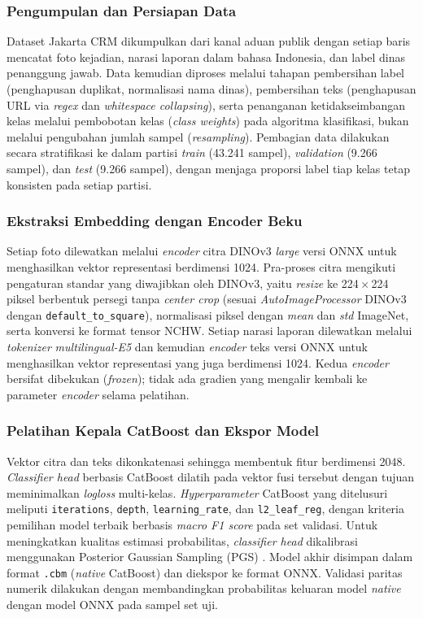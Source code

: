 \subsubsection{Pengumpulan dan Persiapan Data}

Dataset Jakarta CRM dikumpulkan dari kanal aduan publik dengan setiap baris mencatat foto kejadian, narasi laporan dalam bahasa Indonesia, dan label dinas penanggung jawab. Data kemudian diproses melalui tahapan pembersihan label (penghapusan duplikat, normalisasi nama dinas), pembersihan teks (penghapusan URL via \textit{regex} dan \textit{whitespace collapsing}), serta penanganan ketidakseimbangan kelas melalui pembobotan kelas (\textit{class weights}) pada algoritma klasifikasi, bukan melalui pengubahan jumlah sampel (\textit{resampling}). Pembagian data dilakukan secara stratifikasi ke dalam partisi \textit{train} (43.241 sampel), \textit{validation} (9.266 sampel), dan \textit{test} (9.266 sampel), dengan menjaga proporsi label tiap kelas tetap konsisten pada setiap partisi.

\subsubsection{Ekstraksi Embedding dengan Encoder Beku}

Setiap foto dilewatkan melalui \textit{encoder} citra DINOv3 \textit{large} versi ONNX untuk menghasilkan vektor representasi berdimensi 1024. Pra-proses citra mengikuti pengaturan standar yang diwajibkan oleh DINOv3, yaitu \textit{resize} ke 224\,$\times$\,224 piksel berbentuk persegi tanpa \textit{center crop} (sesuai \textit{AutoImageProcessor} DINOv3 dengan \texttt{default\_to\_square}), normalisasi piksel dengan \textit{mean} dan \textit{std} ImageNet, serta konversi ke format tensor NCHW. Setiap narasi laporan dilewatkan melalui \textit{tokenizer} \textit{multilingual-E5} dan kemudian \textit{encoder} teks versi ONNX untuk menghasilkan vektor representasi yang juga berdimensi 1024. Kedua \textit{encoder} bersifat dibekukan (\textit{frozen}); tidak ada gradien yang mengalir kembali ke parameter \textit{encoder} selama pelatihan.

\subsubsection{Pelatihan Kepala CatBoost dan Ekspor Model}

Vektor citra dan teks dikonkatenasi sehingga membentuk fitur berdimensi 2048. \textit{Classifier head} berbasis CatBoost dilatih pada vektor fusi tersebut dengan tujuan meminimalkan \textit{logloss} multi-kelas. \textit{Hyperparameter} CatBoost yang ditelusuri meliputi \texttt{iterations}, \texttt{depth}, \texttt{learning\_rate}, dan \texttt{l2\_leaf\_reg}, dengan kriteria pemilihan model terbaik berbasis \textit{macro F1 score} pada set validasi. Untuk meningkatkan kualitas estimasi probabilitas, \textit{classifier head} dikalibrasi menggunakan Posterior Gaussian Sampling (PGS) \citep{ustimenkoCatBoostUncertainty2023}. Model akhir disimpan dalam format \texttt{.cbm} (\textit{native} CatBoost) dan diekspor ke format ONNX. Validasi paritas numerik dilakukan dengan membandingkan probabilitas keluaran model \textit{native} dengan model ONNX pada sampel set uji.

